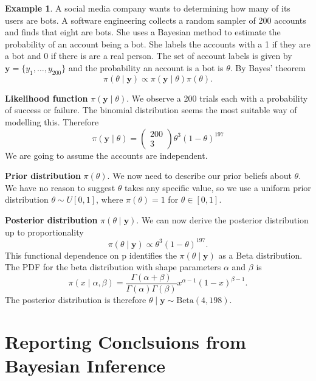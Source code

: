 \documentclass[
]{book}
\theoremstyle{definition}
\theoremstyle{definition}
\newtheorem{example}{Example}[chapter]
\theoremstyle{definition}
\theoremstyle{definition}
\theoremstyle{remark}
\begin{document}
\begin{example}
\protect\hypertarget{exm:binom}{}\label{exm:binom}A social media company wants to determining how many of its users are bots. A software engineering collects a random sampler of 200 accounts and finds that eight are bots. She uses a Bayesian method to estimate the probability of an account being a bot. She labels the accounts with a 1 if they are a bot and 0 if there is are a real person. The set of account labels is given by \(\boldsymbol{y} = \{y_1, \ldots, y_{200}\}\) and the probability an account is a bot is \(\theta\). By Bayes' theorem
\[
\pi(\theta \mid \boldsymbol{y}) \propto \pi(\boldsymbol{y}\mid \theta) \pi(\theta).
\]

\textbf{Likelihood function} \(\pi(\boldsymbol{y}\mid \theta)\). We observe a 200 trials each with a probability of success or failure. The binomial distribution seems the most suitable way of modelling this. Therefore
\[
\pi(\boldsymbol{y}\mid \theta) = \begin{pmatrix} 200 \\ 3 \end{pmatrix} \theta^3(1-\theta)^{197}
\]
We are going to assume the accounts are independent.

\textbf{Prior distribution} \(\pi(\theta)\). We now need to describe our prior beliefs about \(\theta\). We have no reason to suggest \(\theta\) takes any specific value, so we use a uniform prior distribution \(\theta \sim U[0, 1]\), where \(\pi(\theta) = 1\) for \(\theta \in [0, 1]\).

\textbf{Posterior distribution} \(\pi(\theta \mid \boldsymbol{y})\). We can now derive the posterior distribution up to proportionality
\[
\pi(\theta \mid \boldsymbol{y}) \propto \theta^3(1-\theta)^{197}. 
\]
This functional dependence on p identifies the \(\pi(\theta \mid \boldsymbol{y})\) as a Beta distribution. The PDF for the beta distribution with shape parameters \(\alpha\) and \(\beta\) is
\[
\pi(x \mid \alpha, \beta) = \frac{\Gamma(\alpha + \beta)}{\Gamma(\alpha)\Gamma(\beta)}x^{\alpha - 1}(1-x)^{\beta - 1}. 
\]
The posterior distribution is therefore \(\theta \mid \boldsymbol{y} \sim \textrm{Beta}(4, 198)\).
\end{example}

\hypertarget{reporting-conclsuions-from-bayesian-inference}{%
\section{Reporting Conclsuions from Bayesian Inference}\label{reporting-conclsuions-from-bayesian-inference}}
\end{document}
